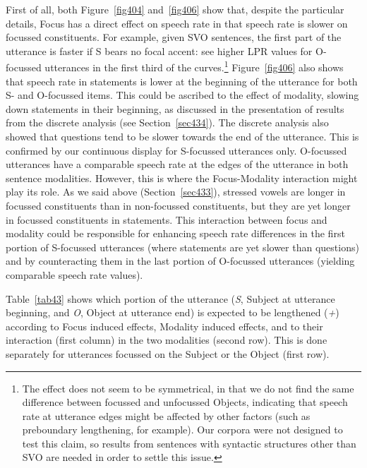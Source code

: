 First of all, both Figure~\ref{fig404} and~\ref{fig406} show that, despite the particular details, Focus has a direct effect on speech rate in that speech rate is slower on focussed constituents. For example, given SVO sentences, the first part of the utterance is faster if S bears no focal accent: see higher LPR values for O-focussed utterances in the first third of the curves.\footnote{The effect does not seem to be symmetrical, in that we do not find the same difference between focussed and unfocussed Objects, indicating that speech rate at utterance edges might be affected by other factors (such as preboundary lengthening, for example). Our corpora were not designed to test this claim, so results from sentences with syntactic structures other than SVO are needed in order to settle this issue.} Figure~\ref{fig406} also shows that speech rate in statements is lower at the beginning of the utterance for both S- and O-focussed items. This could be ascribed to the effect of modality, slowing down statements in their beginning, as discussed in the presentation of results from the discrete analysis (see Section~\ref{sec434}). The discrete analysis also showed that questions tend to be slower towards the end of the utterance. This is confirmed by our continuous display for S-focussed utterances only. O-focussed utterances have a comparable speech rate at the edges of the utterance in both sentence modalities. However, this is where the Focus-Modality interaction might play its role. As we said above (Section~\ref{sec433}), stressed vowels are longer in focussed constituents than in non-focussed constituents, but they are yet longer in focussed constituents in statements. This interaction between focus and modality could be responsible for enhancing speech rate differences in the first portion of S-focussed utterances (where statements are yet slower than questions) and by counteracting them in the last portion of O-focussed utterances (yielding comparable speech rate values). 

Table~\ref{tab43} shows which portion of the utterance (\textit{S}, Subject at utterance beginning, and \textit{O}, Object at utterance end) is expected to be lengthened (\textit{+}) according to Focus induced effects, Modality induced effects, and to their interaction (first column) in the two modalities (second row). This is done separately for utterances focussed on the Subject or the Object (first row).

